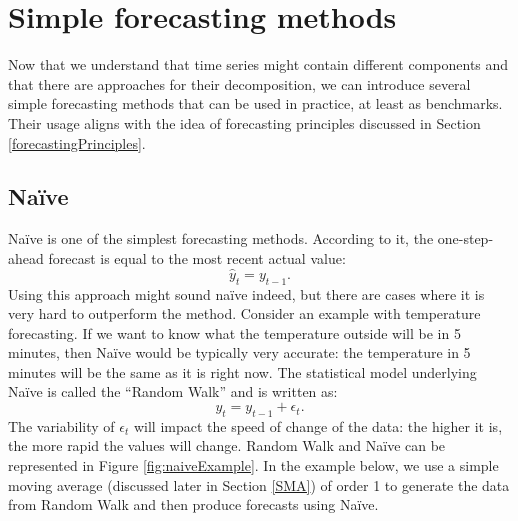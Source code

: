 \documentclass[
]{book}
\newenvironment{Shaded}{\begin{snugshade}}{\end{snugshade}}
\newcommand{\AttributeTok}[1]{\textcolor[rgb]{0.77,0.63,0.00}{#1}}
\newcommand{\ConstantTok}[1]{\textcolor[rgb]{0.00,0.00,0.00}{#1}}
\newcommand{\DecValTok}[1]{\textcolor[rgb]{0.00,0.00,0.81}{#1}}
\newcommand{\FunctionTok}[1]{\textcolor[rgb]{0.00,0.00,0.00}{#1}}
\newcommand{\NormalTok}[1]{#1}
\newcommand{\OtherTok}[1]{\textcolor[rgb]{0.56,0.35,0.01}{#1}}
\newcommand{\SpecialCharTok}[1]{\textcolor[rgb]{0.00,0.00,0.00}{#1}}
\newcommand{\StringTok}[1]{\textcolor[rgb]{0.31,0.60,0.02}{#1}}
\theoremstyle{definition}
\theoremstyle{definition}
\theoremstyle{definition}
\theoremstyle{definition}
\theoremstyle{remark}
\begin{document}
\hypertarget{simpleForecastingMethods}{%
\section{Simple forecasting methods}\label{simpleForecastingMethods}}

Now that we understand that time series might contain different components and that there are approaches for their decomposition, we can introduce several simple forecasting methods that can be used in practice, at least as benchmarks. Their usage aligns with the idea of forecasting principles discussed in Section \ref{forecastingPrinciples}.

\hypertarget{Naive}{%
\subsection{Naïve}\label{Naive}}

Naïve is one of the simplest forecasting methods. According to it, the one-step-ahead forecast is equal to the most recent actual value:
\begin{equation}
    \hat{y}_t = y_{t-1} .
    \label{eq:Naive}
\end{equation}
Using this approach might sound naïve indeed, but there are cases where it is very hard to outperform the method. Consider an example with temperature forecasting. If we want to know what the temperature outside will be in 5 minutes, then Naïve would be typically very accurate: the temperature in 5 minutes will be the same as it is right now. The statistical model underlying Naïve is called the ``Random Walk'' and is written as:
\begin{equation}
    y_t = y_{t-1} + \epsilon_t.
    \label{eq:RandomWalk}
\end{equation}
The variability of \(\epsilon_t\) will impact the speed of change of the data: the higher it is, the more rapid the values will change. Random Walk and Naïve can be represented in Figure \ref{fig:naiveExample}. In the example below, we use a simple moving average (discussed later in Section \ref{SMA}) of order 1 to generate the data from Random Walk and then produce forecasts using Naïve.

\begin{Shaded}
\end{Shaded}
\end{document}
